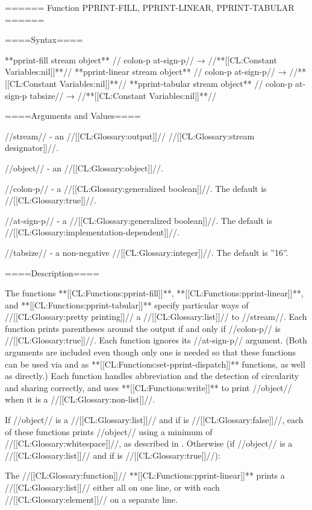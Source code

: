 ====== Function PPRINT-FILL, PPRINT-LINEAR, PPRINT-TABULAR ======

====Syntax====

**pprint-fill {stream object** //\opt} colon-p at-sign-p// → //**[[CL:Constant Variables:nil]]**// **pprint-linear {stream object** //\opt} colon-p at-sign-p// → //**[[CL:Constant Variables:nil]]**// **pprint-tabular {stream object** //\opt} colon-p at-sign-p tabsize// → //**[[CL:Constant Variables:nil]]**//

====Arguments and Values====

//stream// - an //[[CL:Glossary:output]]// //[[CL:Glossary:stream designator]]//.

//object// - an //[[CL:Glossary:object]]//.

//colon-p// - a //[[CL:Glossary:generalized boolean]]//. The default is //[[CL:Glossary:true]]//.

//at-sign-p// - a //[[CL:Glossary:generalized boolean]]//. The default is //[[CL:Glossary:implementation-dependent]]//.

//tabsize// - a non-negative //[[CL:Glossary:integer]]//. The default is ''16''.

====Description====

The functions **[[CL:Functions:pprint-fill]]**, **[[CL:Functions:pprint-linear]]**, and **[[CL:Functions:pprint-tabular]]** specify particular ways of //[[CL:Glossary:pretty printing]]// a //[[CL:Glossary:list]]// to //stream//. Each function prints parentheses around the output if and only if //colon-p// is //[[CL:Glossary:true]]//. Each function ignores its //at-sign-p// argument. (Both arguments are included even though only one is needed so that these functions can be used via  and as **[[CL:Functions:set-pprint-dispatch]]** functions, as well as directly.) Each function handles abbreviation and the detection of circularity and sharing correctly, and uses **[[CL:Functions:write]]** to print //object// when it is a //[[CL:Glossary:non-list]]//.

If //object// is a //[[CL:Glossary:list]]// and if  is //[[CL:Glossary:false]]//, each of these functions prints //object// using a minimum of //[[CL:Glossary:whitespace]]//, as described in \secref\PrintingListsAndConses. Otherwise (if //object// is a //[[CL:Glossary:list]]// and if  is //[[CL:Glossary:true]]//):

\beginlist

\itemitem{\bull} The //[[CL:Glossary:function]]// **[[CL:Functions:pprint-linear]]** prints a //[[CL:Glossary:list]]// either all on one line, or with each //[[CL:Glossary:element]]// on a separate line.

